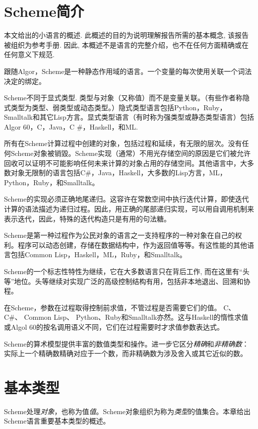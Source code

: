 \chapter*{Scheme简介}

本文给出\rsevenrs 的小语言的概述.
此概述的目的为说明理解\rsevenrs{}报告所需的基本概念, 该报告被组织为参考手册.
因此, 本概述不是语言的完整介绍，也不在任何方面精确或在任何意义下规范.

\vest 跟随Algor，Scheme是一种静态作用域的语言。一个变量的每次使用关联一个词法决定的绑定。

\vest Scheme不同于显式类型. 类型与对象（又称值）而不是变量关联。（有些作者称隐式类型为类型、弱类型或动态类型。）隐式类型语言包括Python，Ruby，Smalltalk和其它Lisp方言。显式类型语言（有时称为强类型或静态类型语言）包括Algor 60，C，Java，C \#，Haskell，和ML.

\vest 所有在Scheme计算过程中创建的对象，包括过程和延续，有无限的层次。没有任何Scheme对象被销毀。Scheme实现（通常）不用光存储空间的原因是它们被允许回收可以证明不可能影响任何未来计算的对象占用的存储空间。其他语言中，大多数对象无限制的语言包括C\#，Java，Haskell，大多数的Lisp方言，ML，Python，Ruby，和Smalltalk。

\vest Scheme的实现必须正确地尾递归。这容许在常数空间中执行迭代计算，即使迭代计算的语法描述为递归过程。因此，用正确的尾部递归实现，可以用自调用机制来表示迭代，因此，特殊的迭代构造只是有用的句法糖。

\vest Scheme是第一种过程作为公民对象的语言之一支持程序的一种对象在自己的权利。程序可以动态创建，存储在数据结构中，作为返回值等等。有这性能的其他语言包括Common Lisp，Haskell，ML，Ruby，和Smalltalk。

\vest Scheme的一个标志性特性为继续，它在大多数语言只在背后工作, 而在这里有``头等''地位。头等继续对实现广泛的高级控制结构有用，包括非本地退出、回溯和协程。

在Scheme，参数在过程取得控制前求值，不管过程是否需要它们的值。 C、 C\#、 Common Lisp、 Python、Ruby和Smalltalk亦然。这与Haskell的惰性求值或Algol 60的按名调用语义不同，它们在过程需要时才求值参数表达式。

Scheme的算术模型提供丰富的数值类型和操作。进一步它区分\textit{精确}和\textit{非精确数}：实际上一个精确数精确对应于一个数，而非精确数为涉及舍入或其它近似的数。

\chapter{基本类型}

Scheme处理\textit{对象}，也称为值\textit{值}。Scheme对象组织为称为\textit{类型}的值集合。本章给出Scheme语言重要基本类型的概述。

